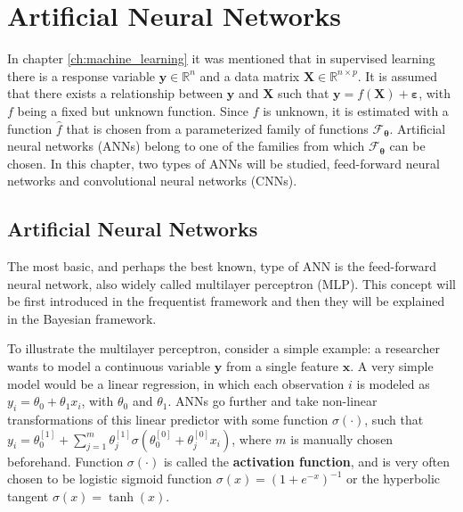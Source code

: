 
\chapter{Artificial Neural Networks}
\label{ch:ann}


In chapter \ref{ch:machine_learning} it was mentioned that in supervised learning there is a response variable $\boldsymbol{y} \in \mathbb{R}^n$ and a data matrix $\boldsymbol{X} \in \mathbb{R}^{n \times p}$. It is assumed that there exists a relationship between $\boldsymbol{y}$ and $\boldsymbol{X}$ such that
$\boldsymbol{y} = f(\boldsymbol{X}) + \boldsymbol{\varepsilon}$,
with $f$ being a fixed but unknown function. Since $f$ is unknown, it is estimated with a function $\hat{f}$ that is chosen from a parameterized family of functions $\mathcal{F}_{\boldsymbol{\theta}}$. Artificial neural networks (ANNs) belong to one of the families from which $\mathcal{F}_{\boldsymbol{\theta}}$ can be chosen. In this chapter, two types of ANNs will be studied, feed-forward neural networks and convolutional neural networks (CNNs).

\section{Artificial Neural Networks}

The most basic, and perhaps the best known, type of ANN is the feed-forward neural network, also widely called multilayer perceptron (MLP). This concept will be first introduced in the frequentist framework and then they will be explained in the Bayesian framework.

To illustrate the multilayer perceptron, consider a simple example: a researcher wants to model a continuous variable $\boldsymbol{y}$ from a single feature $\boldsymbol{x}$. A very simple model would be a linear regression, in which each observation $i$ is modeled as $y_i = \theta_0 + \theta_1 x_i$, with $\theta_0$ and $\theta_1$. ANNs go further and take non-linear transformations of this linear predictor with some function $\sigma(\cdot)$, such that $y_i = \theta_0^{[1]} +  \sum_{j = 1}^m \theta_j^{[1]} \sigma \left( \theta_0^{[0]} + \theta_j^{[0]} x_i \right)$, where $m$ is manually chosen beforehand.
Function $\sigma(\cdot)$ is called the \textbf{activation function}, and is very often chosen to be logistic sigmoid function $\sigma(x) = (1 + e^{-x})^{-1}$
or the hyperbolic tangent $\sigma(x) = \tanh(x)$.

